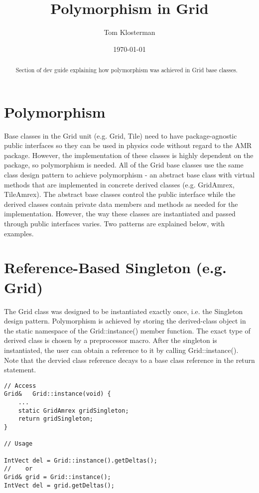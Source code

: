 \documentclass[letterpaper,12pt]{article}
\begin{document}
\title{Polymorphism in Grid}
\author{Tom Klosterman}
\date{\today}
\maketitle

\begin{abstract}
Section of dev guide explaining how polymorphism was achieved in Grid base classes.
\end{abstract}


\section{Polymorphism}

Base classes in the Grid unit (e.g. Grid, Tile) need to have package-agnostic public interfaces so they can be used in physics code without regard to the AMR package. However, the implementation of these classes is highly dependent on the package, so polymorphism is needed. All of the Grid base classes use the same class design pattern to achieve polymorphism - an abstract base class with virtual methods that are implemented in concrete derived classes (e.g. GridAmrex, TileAmrex). The abstract base classes control the public interface while the derived classes contain private data members and methods as needed for the implementation. However, the way these classes are instantiated and passed through public interfaces varies. Two patterns are explained below, with examples.


\section{Reference-Based Singleton (e.g. Grid)}
The Grid class was designed to be instantiated exactly once, i.e. the Singleton design pattern. Polymorphism is achieved by storing the derived-class object in the static namespace of the Grid::instance() member function. The exact type of derived class is chosen by a preprocessor macro. After the singleton is instantiated, the user can obtain a reference to it by calling Grid::instance(). Note that the dervied class reference decays to a base class reference in the return statement.

\begin{verbatim}
// Access
Grid&   Grid::instance(void) {
    ...
    static GridAmrex gridSingleton;
    return gridSingleton;
}

// Usage

IntVect del = Grid::instance().getDeltas();
//    or
Grid& grid = Grid::instance();
IntVect del = grid.getDeltas();
\end{verbatim}
\end{document}

